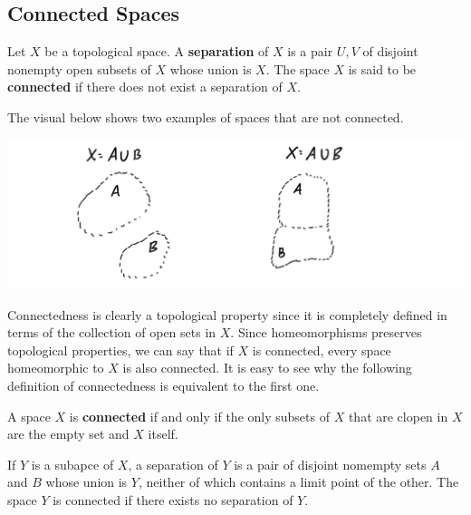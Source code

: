  \subsection{Connected Spaces}

    \begin{definition}[Separation]
      Let $X$ be a topological space. A \textbf{separation} of $X$ is a pair $U, V$ of disjoint nonempty open subsets of $X$ whose union is $X$. The space $X$ is said to be \textbf{connected} if there does not exist a separation of $X$. 

      The visual below shows two examples of spaces that are not connected. 
      \begin{center}
        \includegraphics[scale=0.25]{img/Not_Connected_Spaces_Examples.PNG}
      \end{center}
    \end{definition}

    Connectedness is clearly a topological property since it is completely defined in terms of the collection of open sets in $X$. Since homeomorphisms preserves topological properties, we can say that if $X$ is connected, every space homeomorphic to $X$ is also connected. It is easy to see why the following definition of connectedness is equivalent to the first one. 

    \begin{definition}
      A space $X$ is \textbf{connected} if and only if the only subsets of $X$ that are clopen in $X$ are the empty set and $X$ itself. 
    \end{definition}

    \begin{lemma}
      If $Y$ is a subapce of $X$, a separation of $Y$ is a pair of disjoint nomempty sets $A$ and $B$ whose union is $Y$, neither of which contains a limit point of the other. The space $Y$ is connected if there exists no separation of $Y$. 
    \end{lemma}


